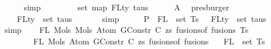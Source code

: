 \begin{isabellebody}
\ \ \ \ \isamarkupfalse%
\ simp\isanewline
\ \ \isamarkupfalse%
\ \isamarkupfalse%
\ {\isachardoublequoteopen}{\isachardot}{\kern0pt}{\isachardot}{\kern0pt}{\isachardot}{\kern0pt}\ {\isacharequal}{\kern0pt}\ {\isasymUnion}\ {\isacharparenleft}{\kern0pt}set\ {\isacharparenleft}{\kern0pt}map\ FLty\ taus{\isacharparenright}{\kern0pt}{\isacharparenright}{\kern0pt}{\isachardoublequoteclose}\isanewline
\ \ \ \ \isamarkupfalse%
\ A{}\ \isamarkupfalse%
\ presburger\isanewline
\ \ \isamarkupfalse%
\ \isamarkupfalse%
\ {\isachardoublequoteopen}{\isachardot}{\kern0pt}{\isachardot}{\kern0pt}{\isachardot}{\kern0pt}\ {\isacharequal}{\kern0pt}\ {\isasymUnion}\ {\isacharparenleft}{\kern0pt}FLty\ {\isacharbackquote}{\kern0pt}\ set\ taus{\isacharparenright}{\kern0pt}{\isachardoublequoteclose}\isanewline
\ \ \ \ \ \isamarkupfalse%
\ simp\isanewline
\ \ \isamarkupfalse%
\ \isamarkupfalse%
\ P{}{\isacharcolon}{\kern0pt}\ {\isachardoublequoteopen}{\isasymUnion}\ {\isacharparenleft}{\kern0pt}FL\ {\isacharbackquote}{\kern0pt}\ set\ Ts{\isacharparenright}{\kern0pt}\ {\isacharequal}{\kern0pt}\ {\isasymUnion}\ {\isacharparenleft}{\kern0pt}FLty\ {\isacharbackquote}{\kern0pt}\ set\ taus{\isacharparenright}{\kern0pt}{\isachardoublequoteclose}\isanewline
\ \ \ \ \isamarkupfalse%
\ simp\isanewline
\isanewline
\ \ \isamarkupfalse%
\ {\isachardoublequoteopen}FL\ {\isacharparenleft}{\kern0pt}Mols{}\ {\isacharparenleft}{\kern0pt}Mols{}\ {\isacharparenleft}{\kern0pt}Atom\ {\isacharparenleft}{\kern0pt}GConstr\ C{\isacharparenright}{\kern0pt}\ zs{\isacharparenright}{\kern0pt}\ {\isacharparenleft}{\kern0pt}fusions{\isacharunderscore}{\kern0pt}of\ fusions{\isacharparenright}{\kern0pt}{\isacharparenright}{\kern0pt}\ Ts{\isacharparenright}{\kern0pt}\ {\isacharequal}{\kern0pt}\isanewline
\ \ \ \ \ \ \ \ FL\ {\isacharparenleft}{\kern0pt}Mols{}\ {\isacharparenleft}{\kern0pt}Atom\ {\isacharparenleft}{\kern0pt}GConstr\ C{\isacharparenright}{\kern0pt}\ zs{\isacharparenright}{\kern0pt}\ {\isacharparenleft}{\kern0pt}fusions{\isacharunderscore}{\kern0pt}of\ fusions{\isacharparenright}{\kern0pt}{\isacharparenright}{\kern0pt}\isanewline
\ {\isasymunion}\ {\isasymUnion}\ {\isacharparenleft}{\kern0pt}FL\ {\isacharbackquote}{\kern0pt}\ set\ {\isacharparenleft}{\kern0pt}Ts{\isacharparenright}{\kern0pt}{\isacharparenright}{\kern0pt}{\isachardoublequoteclose}\isanewline

\end{isabellebody}
